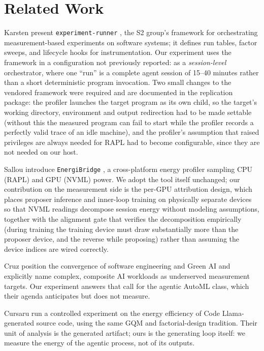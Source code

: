 \section{Related Work}\label{sec:related}

Karsten \etal present \texttt{experiment-runner} \cite{karsten2025experimentrunner}, the S2 group's framework for orchestrating measurement-based experiments on software systems; it defines run tables, factor sweeps, and lifecycle hooks for instrumentation. Our experiment uses the framework in a configuration not previously reported: as a \emph{session-level} orchestrator, where one ``run'' is a complete agent session of 15--40 minutes rather than a short deterministic program invocation. Two small changes to the vendored framework were required and are documented in the replication package: the profiler launches the target program as its own child, so the target's working directory, environment and output redirection had to be made settable (without this the measured program can fail to start while the profiler records a perfectly valid trace of an idle machine), and the profiler's assumption that raised privileges are always needed for RAPL had to become configurable, since they are not needed on our host.

Sallou \etal introduce \texttt{EnergiBridge} \cite{sallou2023energibridge}, a cross-platform energy profiler sampling CPU (RAPL) and GPU (NVML) power. We adopt the tool itself unchanged; our contribution on the measurement side is the per-GPU attribution design, which places proposer inference and inner-loop training on physically separate devices so that NVML readings decompose session energy without modeling assumptions, together with the alignment gate that verifies the decomposition empirically (during training the training device must draw substantially more than the proposer device, and the reverse while proposing) rather than assuming the device indices are wired correctly.

Cruz \etal \cite{cruz2024innovating} position the convergence of software engineering and Green AI and explicitly name complex, composite AI workloads as underserved measurement targets. Our experiment answers that call for the agentic AutoML class, which their agenda anticipates but does not measure.

Cursaru \etal \cite{cursaru2024codellama} run a controlled experiment on the energy efficiency of Code Llama-generated source code, using the same GQM and factorial-design tradition. Their unit of analysis is the generated artifact; ours is the generating loop itself: we measure the energy of the agentic process, not of its outputs.

